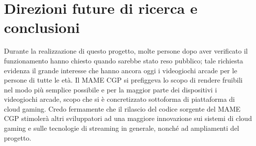 %
%

\chapter*{Direzioni future di ricerca e conclusioni}


Durante la realizzazione di questo progetto, molte persone dopo aver verificato il funzionamento hanno chiesto quando sarebbe stato reso pubblico; tale richiesta evidenza il grande interesse che hanno ancora oggi i videogiochi arcade per le persone di tutte le età. Il MAME CGP si prefiggeva lo scopo di rendere fruibili nel modo più semplice possibile e per la maggior parte dei dispositivi i videogiochi arcade, scopo che si è concretizzato sottoforma di piattaforma di cloud gaming. Credo fermamente che il rilascio del codice sorgente del MAME CGP stimolerà altri sviluppatori ad una maggiore innovazione sui sistemi di cloud gaming e sulle tecnologie di streaming in generale, nonché ad ampliamenti del progetto.

